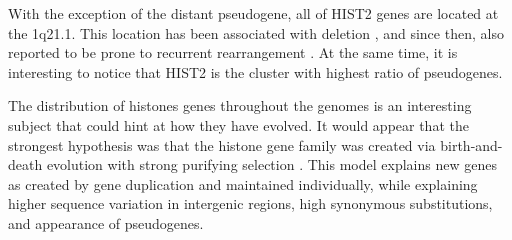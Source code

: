 
    With the exception of the distant pseudogene, all of HIST2 genes are located
    at the 1q21.1. This location has been associated with deletion
    \citep{HISTTwo-prone-deletion-discovery}, and since then, also reported to be prone
    to recurrent rearrangement \citep{HISTTwo-prone-deletion-focus}.
    At the same time, it is interesting to notice that HIST2 is the cluster
    with highest ratio of pseudogenes.


    The distribution of histones genes throughout the genomes is an interesting
    subject that could hint at how they have evolved. It would appear that
    the strongest hypothesis was that the histone gene family was created
    via birth-and-death evolution with strong purifying selection \citep{birth-death-review}.
    This model explains new genes as created by gene duplication and maintained
    individually, while explaining higher sequence variation in intergenic
    regions, high synonymous substitutions, and appearance of pseudogenes.



